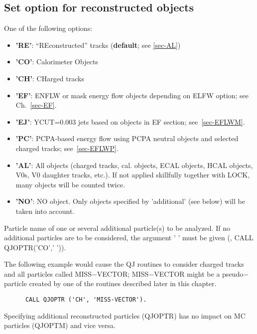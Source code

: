\subsection{\label{sec-QJORE}Set option for reconstructed objects}
\par
{}
\par
\begin{indentlist}{ 2.50cm}{ 2.75cm}
One of the following options:
\begin{itemize}
\item {\bf 'RE'}: ``REconstructed'' tracks
({\bf default}; see \ref{sec-AL})
\item {\bf 'CO'}: Calorimeter Objects
\item {\bf 'CH'}: CHarged tracks
\item {\bf 'EF'}: ENFLW or mask energy flow objects depending on ELFW option;
see Ch.~\ref{sec-EF}.
\item {\bf 'EJ'}: YCUT=0.003 jets based on objects in EF section;
see~\ref{sec-EFLWM}.
\item {\bf 'PC'}: PCPA-based energy flow using PCPA neutral objects and
selected charged tracks; see~\ref{sec-EFLWP}.
\item {\bf 'AL'}: All objects (charged tracks, cal. objects,
ECAL objects, HCAL objects, V0s, V0 daughter tracks, etc.).
If not applied skillfully together
with LOCK, many objects will be counted twice.
\item {\bf 'NO'}: NO object. Only objects specified by
'additional' (see below) will be taken into account.
\end{itemize}
Particle name of one or several additional
particle(s) to be analyzed. If no additional
particles are
to be considered, the argument ' ' must be given
(\eg, CALL QJOPTR('CO',' ')).
\end{indentlist}
The following example would cause the QJ routines to consider charged
tracks and all particles called MISS$-$VECTOR; MISS$-$VECTOR might
be a
pseudo$-$particle created by one of the routines described later in
this
chapter.
\begin{verbatim}
      CALL QJOPTR ('CH', 'MISS-VECTOR').
\end{verbatim}
Specifying additional reconstructed particles (QJOPTR) has no impact
on MC particles (QJOPTM) and vice versa.
 
